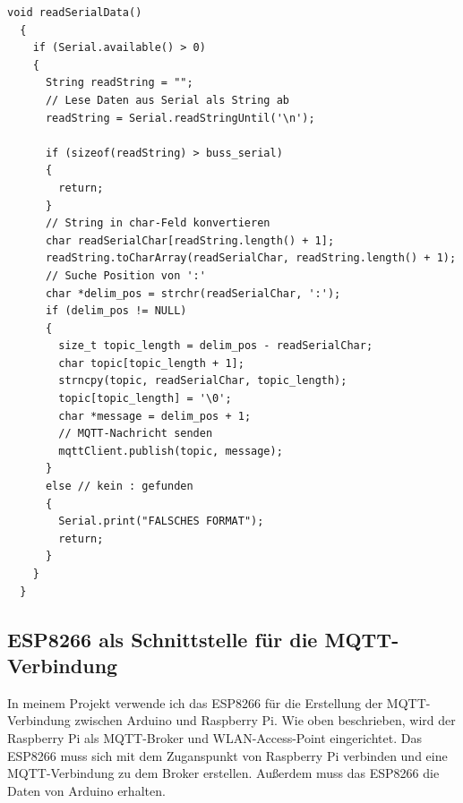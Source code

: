 \documentclass[12pt, letterpaper]{article}
\begin{document}
\begin{Verbatim}[frame=single]
  void readSerialData()
  {
    if (Serial.available() > 0)
    {
      String readString = "";
      // Lese Daten aus Serial als String ab
      readString = Serial.readStringUntil('\n');
      
      if (sizeof(readString) > buss_serial)
      {
        return;
      }
      // String in char-Feld konvertieren
      char readSerialChar[readString.length() + 1];
      readString.toCharArray(readSerialChar, readString.length() + 1);
      // Suche Position von ':'
      char *delim_pos = strchr(readSerialChar, ':');
      if (delim_pos != NULL)
      {
        size_t topic_length = delim_pos - readSerialChar;
        char topic[topic_length + 1];
        strncpy(topic, readSerialChar, topic_length);
        topic[topic_length] = '\0';
        char *message = delim_pos + 1;
        // MQTT-Nachricht senden
        mqttClient.publish(topic, message);
      }
      else // kein : gefunden
      {
        Serial.print("FALSCHES FORMAT");
        return;
      }
    }
  }
\end{Verbatim}
\subsection[ESP8266-Raspberry Pi]{ESP8266 als Schnittstelle für die MQTT-Verbindung}
\par In meinem Projekt verwende ich das ESP8266 für die Erstellung der MQTT-Verbindung zwischen Arduino und Raspberry Pi. Wie oben beschrieben, wird der Raspberry Pi als MQTT-Broker und WLAN-Access-Point eingerichtet. Das ESP8266 muss sich mit dem Zuganspunkt von Raspberry Pi verbinden und eine MQTT-Verbindung zu dem Broker erstellen. Außerdem muss das ESP8266 die Daten von Arduino erhalten.
\end{document}
